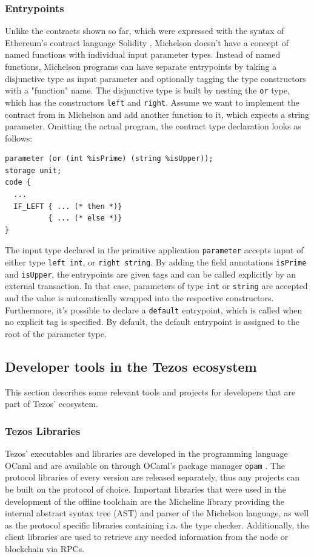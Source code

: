 \subsubsection{Entrypoints}
 Unlike the contracts shown so far, which were expressed with the syntax of Ethereum's contract language Solidity \cite{solidity_docs}, Michelson doesn't have a concept of named functions with individual input parameter types. Instead of named functions, Michelson programs can have separate entrypoints by taking a disjunctive type as input parameter and optionally tagging the type constructors with a "function" name. The disjunctive type is built by nesting the \texttt{or} type, which has the constructors \texttt{left} and \texttt{right}. Assume we want to implement the contract from  in Michelson and add another function to it, which expects a string parameter. Omitting the actual program, the contract type declaration looks as follows:
\begin{lstlisting}[language=Michelson, numbers=none, caption=Michelson contract with two entrypoints]
parameter (or (int %isPrime) (string %isUpper));
storage unit;
code {
  ...
  IF_LEFT { ... (* then *)}
          { ... (* else *)}
}
\end{lstlisting}
The input type declared in the primitive application \texttt{parameter} accepts input of either type \texttt{left int}, or \texttt{right string}. By adding the field annotations \texttt{isPrime} and \texttt{isUpper}, the entrypoints are given tags and can be called explicitly by an external transaction. In that case, parameters of type \texttt{int} or \texttt{string} are accepted and the value is automatically wrapped into the respective constructors. Furthermore, it's possible to declare a \texttt{default} entrypoint, which is called when no explicit tag is specified. By default, the default entrypoint is assigned to the root of the parameter type. \cite{tezos_docs}

\subsection{Developer tools in the Tezos ecosystem}
This section describes some relevant tools and projects for developers that are part of Tezos' ecosystem.

\subsubsection{Tezos Libraries}
Tezos' executables and libraries are developed in the programming language OCaml and are available on through OCaml's package manager \texttt{opam} \cite{tezos_opam}. The protocol libraries of every version are released separately, thus any projects can be built on the protocol of choice. Important libraries that were used in the development of the offline toolchain are the Micheline library providing the internal abstract syntax tree (AST) and parser of the Michelson language, as well as the protocol specific libraries containing i.a. the type checker. Additionally, the client libraries are used to retrieve any needed information from the node or blockchain via RPCs.

